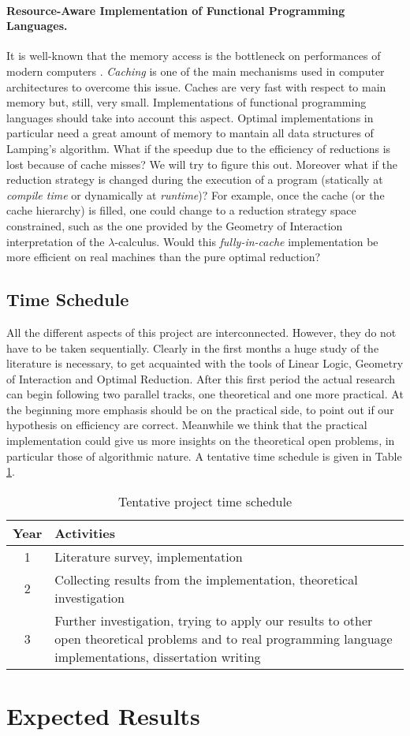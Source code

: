 \documentclass[english]{scrartcl}
\begin{document}
\paragraph{Resource-Aware Implementation of Functional Programming Languages.}It is well-known that the memory access is the bottleneck on performances of modern computers \cite{hennessy_computer_2011}. \emph{Caching} is one of the main mechanisms used in computer architectures to overcome this issue. Caches are very fast with respect to main memory but, still, very small. Implementations of functional programming languages should take into account this aspect. Optimal implementations in particular need a great amount of memory to mantain all data structures of Lamping's algorithm. What if the speedup due to the efficiency of reductions is lost because of cache misses? We will try to figure this out. Moreover what if the reduction strategy is changed during the execution of a program (statically at \emph{compile time} or dynamically at \emph{runtime})? For example, once the cache (or the cache hierarchy) is filled, one could change to a reduction strategy space constrained, such as the one provided by the Geometry of Interaction interpretation of the $\lambda$-calculus. Would this \emph{fully-in-cache} implementation be more efficient on real machines than the pure optimal reduction?
\subsection*{Time Schedule}All the different aspects of this project are interconnected. However, they do not have to be taken sequentially. Clearly in the first months a huge study of the literature is necessary, to get acquainted with the tools of Linear Logic, Geometry of Interaction and Optimal Reduction. After this first period the actual research can begin following two parallel tracks, one theoretical and one more practical. At the beginning more emphasis should be on the practical side, to point out if our hypothesis on efficiency are correct. Meanwhile we think that the practical implementation could give us more insights on the theoretical open problems, in particular those of algorithmic nature. A tentative time schedule is given in Table \ref{table:schedule}.
\begin{table}[h]
	\centering
	\begin{tabular}{|c|>{\raggedright}m{10cm}|}
		\hline 
		\textbf{Year} & \textbf{Activities}\tabularnewline
		\hline 
		\hline 
		1 & Literature survey, implementation\tabularnewline
		\hline 
		2 & Collecting results from the implementation, theoretical investigation \tabularnewline
		\hline 
		3 & Further investigation, trying to apply our results to other open theoretical problems and to real programming language implementations, dissertation writing \tabularnewline
		\hline 
	\end{tabular}
	\caption{Tentative project time schedule}
	\label{table:schedule}
\end{table}
\section{Expected Results}


\end{document}
